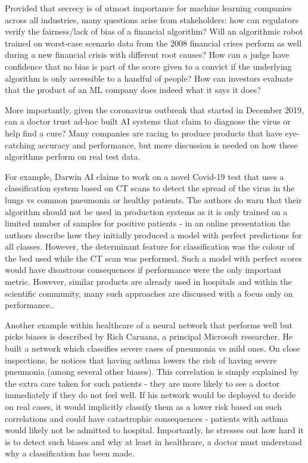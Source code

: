 \documentclass[proposal]{softeng}
\begin{document}
    Provided that secrecy is of utmost importance for machine learning companies across all industries, many questions arise from stakeholders: how can regulators verify the fairness/lack of bias of a financial algorithm? Will an algorithmic robot trained on worst-case scenario data from the 2008 financial crises perform as well during a new financial crisis with different root causes? How can a judge have confidence that no bias is part of the score given to a convict if the underlying algorithm is only accessible to a handful of people? How can investors evaluate that the product of an ML company does indeed what it says it does?

    More importantly, given the coronavirus outbreak that started in December 2019, can a doctor trust ad-hoc built AI systems that claim to diagnose the virus or help find a cure? Many companies are racing to produce products that have eye-catching accuracy and performance, but more discussion is needed on how these algorithms perform on real test data.

    For example, Darwin AI \cite{DarwinAI} claims to work on a novel Covid-19 test that uses a classification system based on CT scans to detect the spread of the virus in the lungs vs common pneumonia or healthy patients\cite{covid-net}. The authors do warn that their algorithm should not be used in production systems as it is only trained on a limited number of samples for positive patients - in an online presentation the authors describe how they initially produced a model with perfect predictions for all classes. However, the determinant feature for classification was the colour of the bed used while the CT scan was performed. Such a model with perfect scores would have disastrous consequences if performance were the only important metric. However, similar products are already used in hospitals\cite{aids-doctors} and within the scientific community, many such approaches are discussed with a focus only on performance.\cite{ai-covid-19}.

    Another example within healthcare of a neural network that performs well but picks biases is described by Rich Caruana, a principal Microsoft researcher. He built a network which classifies severe cases of pneumonia vs mild ones\cite{rich-caruana}. On close inspections, he notices that having asthma lowers the risk of having severe pneumonia (among several other biases). This correlation is simply explained by the extra care taken for such patients - they are more likely to see a doctor immediately if they do not feel well. If his network would be deployed to decide on real cases, it would implicitly classify them as a lower risk based on such correlations and could have catastrophic consequences - patients with asthma would likely not be admitted to hospital. Importantly, he stresses out how hard it is to detect such biases and why at least in healthcare, a doctor must understand why a classification has been made.
\end{document}
